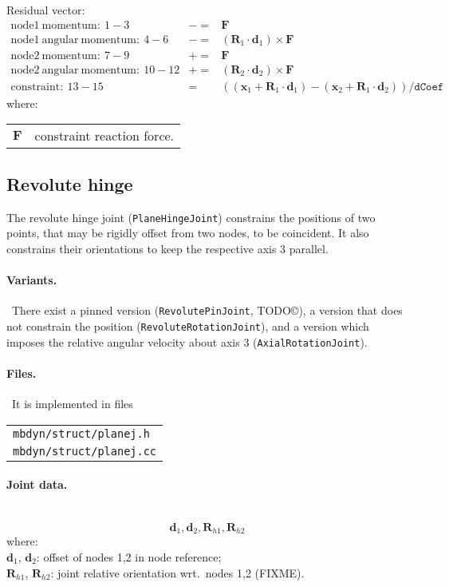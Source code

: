 \documentclass[10pt,dvips,fleqn,subeqn]{report}
\newcommand{\T}[1]{\bm{#1}}
\begin{document}
\noindent
Residual vector:
\begin{eqnarray*}
	\mathrm{node1\ momentum}:\ 1-3& -= & \T F \\
	\mathrm{node1\ angular\ momentum}:\ 4-6& -= & 
		(\T R_1\cdot \T d_1) \times \T F \\
	\mathrm{node2\ momentum}:\ 7-9& += & \T F \\
	\mathrm{node2\ angular\ momentum}:\ 10-12& += & 
		(\T R_2\cdot \T d_2) \times \T F \\
	\mathrm{constraint}:\ 13-15& = &  ((\T x_1+\T R_1\cdot \T d_1) - 
			(\T x_2+\T R_1\cdot \T d_2))/\texttt{dCoef}
\end{eqnarray*}
where:

\noindent
\begin{tabular}{ll}
$\T{F}$ & constraint reaction force.
\end{tabular}



\subsection{Revolute hinge}
The revolute hinge joint (\texttt{PlaneHingeJoint}) constrains the positions 
of two points, that may be rigidly offset from two nodes, 
to be coincident.
It also constrains their orientations to keep the respective axis 3 
parallel.

\paragraph{Variants.} \
There exist a pinned version (\texttt{RevolutePinJoint}, TODO\copyright),
a version that does not constrain the position (\texttt{RevoluteRotationJoint}),
and a version which imposes the relative angular velocity about axis 3
(\texttt{AxialRotationJoint}).

\paragraph{Files.} \
It is implemented in files

\begin{tabular}{l}
\texttt{mbdyn/struct/planej.h} \\
\texttt{mbdyn/struct/planej.cc}
\end{tabular}

\paragraph{Joint data.} \
\begin{equation}
\T d_1, \T d_2, \T R_{h1}, \T R_{h2}
\end{equation}
where:\\
$\T d_1$, $\T d_2$: offset of nodes 1,2 in node reference;\\
$\T R_{h1}$, $\T R_{h2}$: joint relative orientation wrt.\ nodes 1,2 (FIXME).\\
\end{document}
